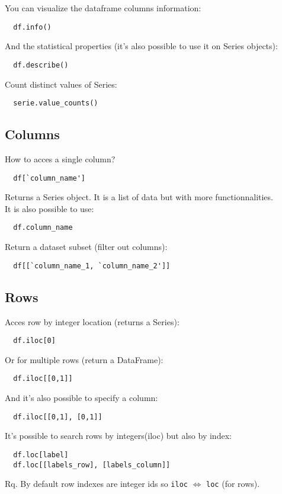 \documentclass[french]{article}
\begin{document}
You can visualize the dataframe columns information:
\begin{verbatim}
  df.info()
\end{verbatim}

And the statistical properties (it's also possible to use it on Series objects): 
\begin{verbatim}
  df.describe()
\end{verbatim}


Count distinct values of Series:
\begin{verbatim}
  serie.value_counts()
\end{verbatim}

\subsection{Columns}

How to acces a single column?
\begin{verbatim}
  df[`column_name']
\end{verbatim}
Returns a Series object. It is a list of data but with more functionnalities.\\
It is also possible to use:
\begin{verbatim}
  df.column_name
\end{verbatim}
Return a dataset subset (filter out columns):
\begin{verbatim}
  df[[`column_name_1, `column_name_2']]
\end{verbatim}

\subsection{Rows}
Acces row by integer location (returns a Series):
\begin{verbatim}
  df.iloc[0]
\end{verbatim}
Or for multiple rows (return a DataFrame):
\begin{verbatim}
  df.iloc[[0,1]]
\end{verbatim}
And it's also possible to specify a column:
\begin{verbatim}
  df.iloc[[0,1], [0,1]]
\end{verbatim}
It's possible to search rows by integers(iloc) but also by index:
\begin{verbatim}
  df.loc[label]
  df.loc[[labels_row], [labels_column]]
\end{verbatim}
Rq. By default row indexes are integer ids so \verb|iloc| $\Leftrightarrow$ \verb|loc| (for rows). \\
\end{document}
